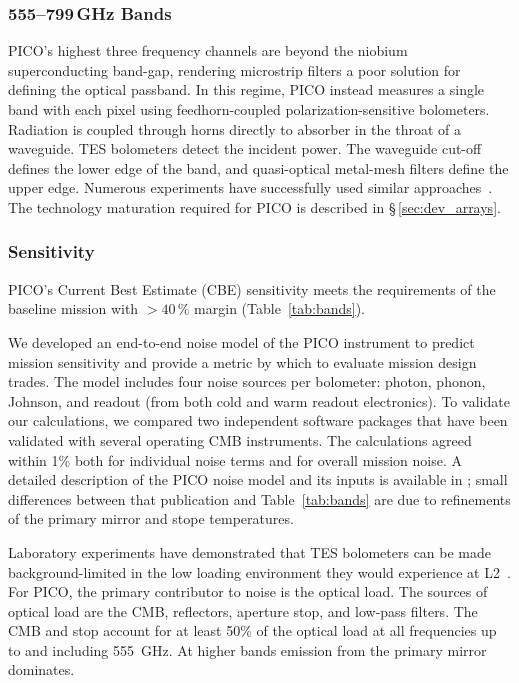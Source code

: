 \subsubsection{555--799\,GHz Bands}
\label{sec:high_freq_det} %

PICO's highest three frequency channels are beyond the niobium superconducting band-gap, rendering microstrip filters a poor solution for defining the optical passband. In this regime, PICO instead measures a single band with each pixel using feedhorn-coupled polarization-sensitive bolometers. Radiation is coupled through horns directly to absorber in the throat of a waveguide. TES bolometers detect the incident power.  The waveguide cut-off defines the lower edge of the band, and quasi-optical metal-mesh filters define the upper edge. Numerous experiments have successfully used similar approaches~\citep{Shirokoff2011,Bleem2012,Turner2001}. The technology maturation required for PICO is described in \S\,\ref{sec:dev_arrays}.



\subsubsection{Sensitivity}
\label{sec:sensitivity} %

PICO's Current Best Estimate (CBE) sensitivity meets the requirements of the baseline mission with \hbox{$>40\,\%$} margin (Table~\ref{tab:bands}). 

We developed an end-to-end noise model of the PICO instrument to predict mission sensitivity and provide a metric by which to evaluate mission design trades. The model includes four noise sources per bolometer: photon, phonon, Johnson, and readout (from both cold and warm readout electronics). To validate our calculations, we compared two independent software packages that have been validated with several operating CMB instruments. The calculations agreed within 1\% both for individual noise terms and for overall mission noise. A detailed description of the PICO noise model and its inputs is available in \citet{Young2018}; small differences between that publication and Table~\ref{tab:bands} are due to refinements of the primary mirror and stope temperatures. 


Laboratory experiments have demonstrated that TES bolometers can be made background-limited in the low loading environment they would experience at L2~\citep{Beyer2012}. For PICO, the primary contributor to noise is the optical load. The sources of optical load are the CMB, reflectors, aperture stop, and low-pass filters. The CMB and stop account for at least 50\% of the optical load at all frequencies up to and including 555~GHz. At higher bands emission from the primary mirror dominates. 

